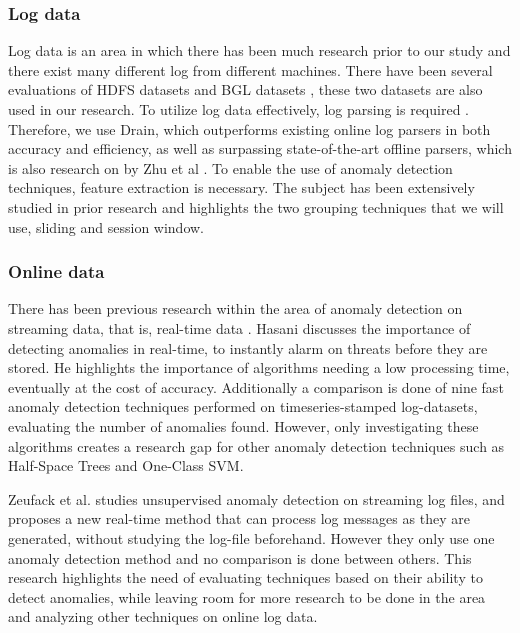 \subsubsection{Log data}
Log data is an area in which there has been much research prior to our study and there exist many different log  from different machines. There have been several evaluations of HDFS datasets \cite{Shilin2017experiencereport} \cite{ZEUFACK2021100030Anunsupervisedanomalydetection} \cite{zhu2023loghublargecollectionlog} \cite{Wei2010consolelogs} \cite{Pinja2017Drain} \cite{Guo2021LogBERT} \cite{Le2022LogBased} and BGL datasets \cite{Guo2021LogBERT} \cite{Le2022LogBased} \cite{Shilin2017experiencereport}\cite{zhu2023loghublargecollectionlog}\cite{Pinja2017Drain}, these two datasets are also used in our research. To utilize log data effectively, log parsing is required \cite{zhu2019toolsbenchmarksautomatedlog}. Therefore, we use Drain, which outperforms existing online log parsers in both accuracy and efficiency, as well as surpassing state-of-the-art offline parsers\cite{Pinja2017Drain}, which is also research on by Zhu et al \cite{zhu2019toolsbenchmarksautomatedlog}. To enable the use of anomaly detection techniques, feature extraction is necessary. The subject has been extensively studied in prior research \cite{Shilin2017experiencereport} \cite{Gautam2018bigdatarealtime} and highlights the two grouping techniques that we will use, sliding and session window.

\subsubsection{Online data}
There has been previous research within the area of anomaly detection on streaming data, that is, real-time data \cite{Hasani2017robustanomaly}\cite{ZEUFACK2021100030Anunsupervisedanomalydetection}. Hasani \cite{Hasani2017robustanomaly} discusses the importance of detecting anomalies in real-time, to instantly alarm on threats before they are stored. He highlights the importance of algorithms needing a low processing time, eventually at the cost of accuracy. Additionally a comparison is done of nine fast anomaly detection techniques performed on timeseries-stamped log-datasets, evaluating the number of anomalies found. However, only investigating these algorithms creates a research gap for other anomaly detection techniques such as Half-Space Trees and One-Class SVM. 

Zeufack et al. \cite{ZEUFACK2021100030Anunsupervisedanomalydetection} studies unsupervised anomaly detection on streaming log files, and proposes a new real-time method that can process log messages as they are generated, without studying the log-file beforehand. However they only use one anomaly detection method and no comparison is done between others. This research highlights the need of evaluating techniques based on their ability to detect anomalies, while leaving room for more research to be done in the area and analyzing other techniques on online log data.  

